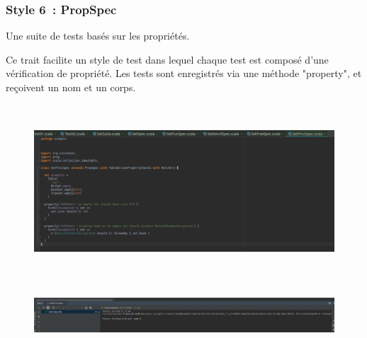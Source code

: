 \documentclass[12pt]{article}
\begin{document}

\par

\subsubsection{Style 6 : PropSpec}

\begin{justify}
Une suite de tests basés sur les propriétés.
\end{justify}\par

\begin{justify}
Ce trait facilite un style de test dans lequel chaque test est composé d'une vérification de propriété. Les tests sont enregistrés via une méthode "property", et reçoivent un nom et un corps.
\end{justify}\par




\begin{figure}[H]
	\begin{Center}
		\includegraphics[width=6.3in,height=2.55in]{./media/image36.png}
	\end{Center}
\end{figure}



\par




\begin{figure}[H]
	\begin{Center}
		\includegraphics[width=6.3in,height=0.72in]{./media/image37.png}
	\end{Center}
\end{figure}



\par


\printbibliography
\end{document}
